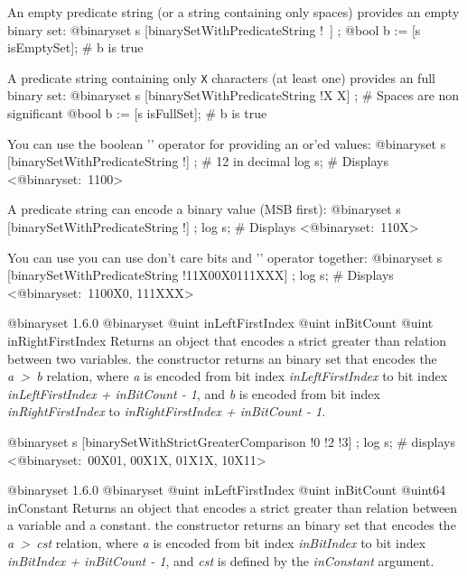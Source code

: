 \exempleDeuxLignes
{An empty predicate string (or a string containing only spaces) provides an empty binary set:}
{@binaryset s [binarySetWithPredicateString !\textquotedbl~\textquotedbl] ;}
{@bool b := [s isEmptySet]; \# b is true}


\exempleDeuxLignes
{A predicate string containing only \texttt{\textquotesingle X\textquotesingle} characters (at least one) provides an full binary set:}
{@binaryset s [binarySetWithPredicateString !\textquotedbl X X\textquotedbl] ; \# Spaces are non significant}
{@bool b := [s isFullSet]; \# b is true}


\exempleDeuxLignes
{You can use the boolean '\textbar' operator for providing an or'ed values:}
{@binaryset s [binarySetWithPredicateString !\textquotedbl] ; \# 12 in decimal}
{log s; \# Displays <@binaryset:~1100>}


\exempleDeuxLignes
{A predicate string can encode a binary value (MSB first):}
{@binaryset s [binarySetWithPredicateString !\textquotedbl] ;}
{log s; \# Displays <@binaryset:~110X>}



\exempleDeuxLignes
{You can use you can use don't care bits and '\textbar' operator together:}
{@binaryset s [binarySetWithPredicateString !\textquotedbl 11X00X0\textbar 111XXX\textquotedbl] ;}
{log s; \# Displays <@binaryset:~1100X0, 111XXX>}





{@binaryset}
{1.6.0}
{@binaryset}
{@uint inLeftFirstIndex}
{@uint inBitCount}
{@uint inRightFirstIndex}
{Returns an  object that encodes a strict greater than relation between two variables.}
{the constructor returns an binary set that encodes the \emph{a~>~b} relation, where \emph{a} is encoded from bit index \emph{inLeftFirstIndex} to bit index \emph{inLeftFirstIndex  + inBitCount - 1}, and \emph{b} is encoded from bit index \emph{inRightFirstIndex} to \emph{inRightFirstIndex + inBitCount - 1}.}

\exempleDeuxLignes
{}
{@binaryset s [binarySetWithStrictGreaterComparison !0 !2 !3] ;}
{log s; \# displays <@binaryset:~00X01, 00X1X, 01X1X, 10X11>}





{@binaryset}
{1.6.0}
{@binaryset}
{@uint inLeftFirstIndex}
{@uint inBitCount}
{@uint64 inConstant}
{Returns an  object that encodes a strict greater than relation between a variable and a constant.}
{the constructor returns an binary set that encodes the \emph{a~>~cst} relation, where \emph {a} is encoded from bit index \emph{inBitIndex} to bit index \emph{inBitIndex  + inBitCount - 1}, and \emph{cst} is defined by the \emph{inConstant} argument.}





